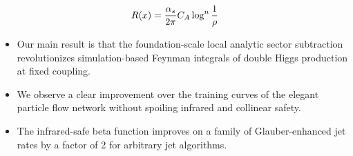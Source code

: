 \begin{equation}
  R(x) = \frac{\alpha_s}{2\pi} C_A \log^{n} \frac{1}{\rho}
  \label{eq:2}
\end{equation}

\begin{itemize}
  \item Our main result is that the foundation-scale local analytic sector subtraction revolutionizes simulation-based Feynman integrals of double Higgs production at fixed coupling.
  \item We observe a clear improvement over the training curves of the elegant particle flow network without spoiling infrared and collinear safety.
  \item The infrared-safe beta function improves on a family of Glauber-enhanced jet rates by a factor of 2 for arbitrary jet algorithms.
\end{itemize}

